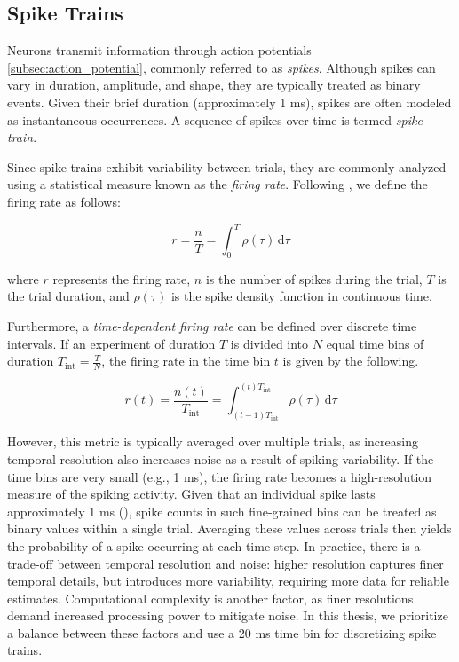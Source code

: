 \subsection{Spike Trains}
\label{subsec:spike_trains}

Neurons transmit information through action potentials \ref{subsec:action_potential}, commonly referred to as \emph{spikes}. Although spikes can vary in duration, amplitude, and shape, they are typically treated as binary events. Given their brief duration (approximately 1 ms), spikes are often modeled as instantaneous occurrences. A sequence of spikes over time is termed \emph{spike train}.

Since spike trains exhibit variability between trials, they are commonly analyzed using a statistical measure known as the \emph{firing rate}. Following \citet{dayan2005theoretical}, we define the firing rate as follows:

\begin{equation}
    r = \frac{n}{T} = \int_{0}^{T} \rho(\tau) \,\mathrm{d}\tau
\end{equation}
\label{eq:firing_rate}

where $r$ represents the firing rate, $n$ is the number of spikes during the trial, $T$ is the trial duration, and $\rho(\tau)$ is the spike density function in continuous time.

Furthermore, a \emph{time-dependent firing rate} can be defined over discrete time intervals. If an experiment of duration $T$ is divided into $N$ equal time bins of duration $T_{\text{int}} = \frac{T}{N}$, the firing rate in the time bin $t$ is given by the following.

\begin{equation}
    r(t) = \frac{n(t)}{T_{\text{int}}} 
    = \int_{(t-1)T_{\text{int}}}^{(t)T_{\text{int}}} \rho(\tau) \,\mathrm{d}\tau
\end{equation}
\label{eq:firing_rate_time}


However, this metric is typically averaged over multiple trials, as increasing temporal resolution also increases noise as a result of spiking variability. If the time bins are very small (e.g., 1 ms), the firing rate becomes a high-resolution measure of the spiking activity. Given that an individual spike lasts approximately 1 ms (\citet{dayan2005theoretical}), spike counts in such fine-grained bins can be treated as binary values within a single trial. Averaging these values across trials then yields the probability of a spike occurring at each time step. In practice, there is a trade-off between temporal resolution and noise: higher resolution captures finer temporal details, but introduces more variability, requiring more data for reliable estimates. Computational complexity is another factor, as finer resolutions demand increased processing power to mitigate noise. In this thesis, we prioritize a balance between these factors and use a 20 ms time bin for discretizing spike trains.

